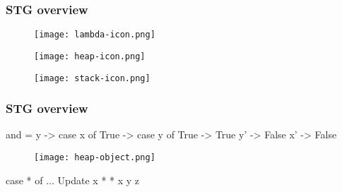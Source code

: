 \documentclass[bigger,aspectratio=169]{beamer}
\begin{document}
\begin{frame}[fragile]
\frametitle{STG overview}
\begin{center}

	\begin{minipage}{0.25\textwidth}
		\begin{figure}
			\texttt{[image: lambda-icon.png]}
		\end{figure}
	\end{minipage}
	\hfill
	\begin{minipage}{0.30\textwidth}
		\begin{figure}
			\texttt{[image: heap-icon.png]}
		\end{figure}
	\end{minipage}
	\hfill
	\begin{minipage}{0.30\textwidth}
		\begin{figure}
			\texttt{[image: stack-icon.png]}
		\end{figure}
	\end{minipage}

\end{center}
\end{frame}

\begin{frame}[fragile]
\frametitle{STG overview}
\begin{center}

	\begin{minipage}{0.30\textwidth}
		\vspace{-3cm}
		\begin{haskellcode}
			and = \x y -> case x of
			 True -> case y of
			  True -> True
			   y' -> False
			 x' -> False
		\end{haskellcode}
	\end{minipage}
	\hfill
	\begin{minipage}{0.30\textwidth}
		\vspace{0.75cm}
		\begin{figure}
			\texttt{[image: heap-object.png]}
		\end{figure}
	\end{minipage}
	\hfill
	\begin{minipage}{0.30\textwidth}
		\vspace{5cm}
		\begin{haskellcode}
			case * of {...}
			Update x *
			* x y z
		\end{haskellcode}
	\end{minipage}

\end{center}
\end{frame}
\end{document}
